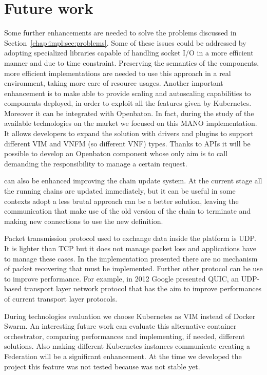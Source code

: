\chapter{Future work}
\label{chap:future}

Some further enhancements are needed to solve the problems discussed in
Section~\ref{chap:impl:sec:problems}. Some of these issues could be addressed
by adopting specialized libraries capable of handling socket I/O in a more
efficient manner and due to time constraint. Preserving the semantics
of the components, more efficient implementations are needed to use this
approach in a real environment, taking more care of resource usages. Another
important enhancement is to make \harbor{} able to provide scaling and
autoscaling capabilities to components deployed, in order to exploit all the
features given by Kubernetes. Moreover it can be integrated with Openbaton. In
fact, during the study of the available technologies on the market we focused
on this MANO implementation. It allows developers to expand the solution with
drivers and plugins to support different VIM and VNFM (so different VNF) types.
Thanks to \harbor{} APIs it will be possible to develop an Openbaton component
whose only aim is to call \harbor{} demanding the responsibility to manage a
certain request.

\harbor{} can also be enhanced improving the chain update system. At the current
stage all the running chains are updated immediately, but it can be useful in
some contexts adopt a less brutal approach can be a better solution, leaving
the communication that make use of the old version of the chain to terminate
and making new connections to use the new definition.

Packet transmission protocol used to exchange data inside the platform is UDP.
It is lighter than TCP but it does not manage packet loss and applications have
to manage these cases. In the implementation presented there are no mechanism of
packet recovering that must be implemented. Further other protocol can be use to
improve performance. For example, in 2012 Google presented QUIC, an UDP-based
transport layer network protocol that has the aim to improve performances of
current transport layer protocols.

During technologies evaluation we choose Kubernetes as VIM instead of Docker
Swarm. An interesting future work can evaluate this alternative container
orchestrator, comparing performances and implementing, if needed, different
solutions. Also making different Kubernetes instances communicate creating
a Federation will be a significant enhancement. At the time we developed the
project this feature was not tested because was not stable yet.

